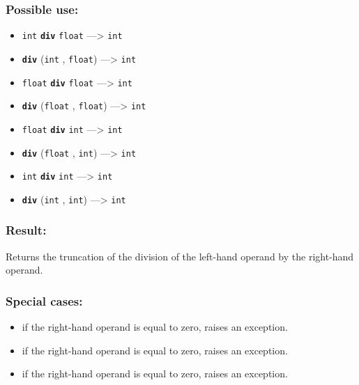 \documentclass[]{book}
\providecommand{\tightlist}{%
  \setlength{\itemsep}{0pt}\setlength{\parskip}{0pt}}
\theoremstyle{definition}
\theoremstyle{definition}
\theoremstyle{definition}
\theoremstyle{remark}
\begin{document}
\subsubsection{Possible use:}\label{possible-use-140}

\begin{itemize}
\tightlist
\item
  \texttt{int} \textbf{\texttt{div}} \texttt{float} ---\textgreater{}
  \texttt{int}
\item
  \textbf{\texttt{div}} (\texttt{int} , \texttt{float})
  ---\textgreater{} \texttt{int}
\item
  \texttt{float} \textbf{\texttt{div}} \texttt{float} ---\textgreater{}
  \texttt{int}
\item
  \textbf{\texttt{div}} (\texttt{float} , \texttt{float})
  ---\textgreater{} \texttt{int}
\item
  \texttt{float} \textbf{\texttt{div}} \texttt{int} ---\textgreater{}
  \texttt{int}
\item
  \textbf{\texttt{div}} (\texttt{float} , \texttt{int})
  ---\textgreater{} \texttt{int}
\item
  \texttt{int} \textbf{\texttt{div}} \texttt{int} ---\textgreater{}
  \texttt{int}
\item
  \textbf{\texttt{div}} (\texttt{int} , \texttt{int}) ---\textgreater{}
  \texttt{int}
\end{itemize}

\subsubsection{Result:}\label{result-136}

Returns the truncation of the division of the left-hand operand by the
right-hand operand.

\subsubsection{Special cases:}\label{special-cases-52}

\begin{itemize}
\tightlist
\item
  if the right-hand operand is equal to zero, raises an exception.\\
\item
  if the right-hand operand is equal to zero, raises an exception.\\
\item
  if the right-hand operand is equal to zero, raises an exception.
\end{itemize}
\end{document}
